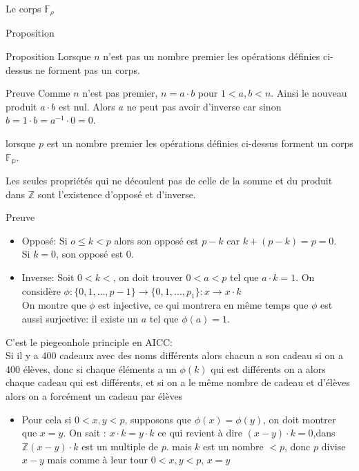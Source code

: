 \begin{parag}{Le corps $\mathbb{F_\rho}$}
\begin{subparag}{Proposition}
    \begin{theoreme}{Proposition}
        Lorsque $n$ n'est pas un nombre premier les opérations définies ci-dessus ne forment pas un corps.
    \end{theoreme}
\end{subparag}
\begin{subparag}{Preuve}
    Comme $n$ n'est pas premier, $n = a \cdot b$ pour $1 < a, b < n$.
    Ainsi le nouveau produit $a \cdot b$ est nul. Alors $a$ ne peut pas avoir d'inverse car sinon $b = 1 \cdot b = a^{-1} \cdot 0 = 0$.
\end{subparag}   
\begin{theoreme}
    lorsque $p$ est un nombre premier les opérations définies ci-dessus forment un corps $\mathbb{F_p}$.
\end{theoreme}
Les seules propriétés qui ne découlent pas de celle de la somme et du produit dans $\mathbb{Z}$ sont l'existence d'opposé et d'inverse.
\begin{subparag}{Preuve}
    \begin{itemize}
        \item Opposé: Si $o \leq k < p$ alors son opposé est $p-k$ car $k + (p-k) = p = 0$.\\
        Si $k = 0$, son opposé est $0$.
        \item Inverse: Soit $0 < k <$, on doit trouver $0 < a  < p$ tel que $a \cdot k = 1$. On considère $\phi : \{0, 1, \dots, p-1\} \to \{0, 1, \dots, p_1\} : x \to x \cdot k $\\
        On montre que $\phi$ est injective, ce qui montrera en même temps que $\phi$ est aussi surjective: il existe un $a$ tel que $\phi(a) = 1$.
    \end{itemize}
    \begin{framedremark}
        C'est le piegeonhole principle en AICC:
        \\
        Si il y a 400 cadeaux avec des noms différents alors chacun a son cadeau si on a 400 élèves, donc si chaque éléments a un $\phi(k)$ qui est différents on a alors chaque cadeau qui est différents, et si on a le même nombre de cadeau et d’élèves alors on a forcément un cadeau par élèves
    \end{framedremark}
    \begin{itemize}
        \item Pour cela si $0 < x, y<p$, supposons que $\phi(x) = \phi(y)$, on doit montrer que $x = y$. On sait : $x \cdot k = y \cdot k$ ce qui revient à dire $(x-y)\cdot k = 0$,dans $\mathbb{Z} (x-y)\cdot k$ est un multiple de $p$. mais $k$ est un nombre $< p$, donc $p$ divise $x - y$ mais comme à leur tour $0 < x, y < p$, $x = y$

\end{itemize}
\end{subparag}
\end{parag}
